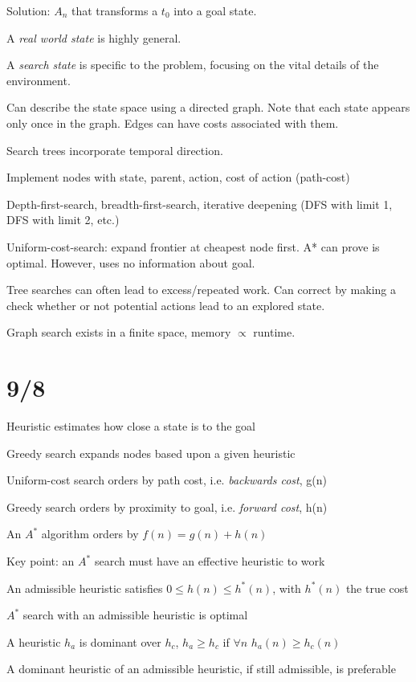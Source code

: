 \documentclass[12pt]{article}
\begin{document}
Solution: ${A_n}$ that transforms a $t_0$ into a goal state.

A \textit{real world state} is highly general.

A \textit{search state} is specific to the problem, focusing on the vital details of the environment.

Can describe the state space using a directed graph.  Note that each state appears only once in the graph.  Edges can have costs associated with them.

Search trees incorporate temporal direction.

Implement nodes with state, parent, action, cost of action (path-cost)

Depth-first-search, breadth-first-search, iterative deepening (DFS with limit 1, DFS with limit 2, etc.)

Uniform-cost-search: expand frontier at cheapest node first. A* can prove is optimal. However, uses no information about goal.

Tree searches can often lead to excess/repeated work.  Can correct by making a check whether or not potential actions lead to an explored state.

Graph search exists in a finite space, memory $\propto$ runtime.

\section{9/8}

Heuristic estimates how close a state is to the goal

Greedy search expands nodes based upon a given heuristic

Uniform-cost search orders by path cost, i.e. \textit{backwards cost}, g(n)

Greedy search orders by proximity to goal, i.e. \textit{forward cost}, h(n)

An $A^*$ algorithm orders by $f(n) = g(n) + h(n)$

Key point: an $A^*$ search must have an effective heuristic to work

An admissible heuristic satisfies $0 \leq h(n) \leq h^*(n)$, with $h^*(n)$ the true cost

$A^*$ search with an admissible heuristic is optimal

A heuristic $h_a$ is dominant over $h_c$, $h_a \geq h_c$ if $\forall n$ $h_a(n) \geq h_c(n)$

A dominant heuristic of an admissible heuristic, if still admissible, is preferable
\end{document}
